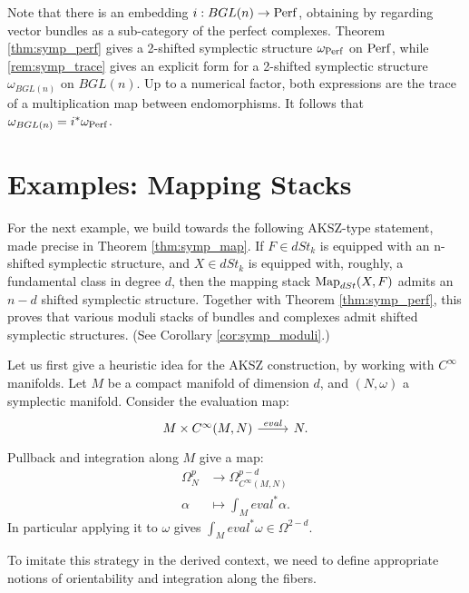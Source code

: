 \begin{rem}
Note that there is an embedding $i: BGL(n) \to \mathrm{Perf}$, obtaining by regarding vector bundles as a sub-category of the perfect
complexes. Theorem \ref{thm:symp_perf} gives a 2-shifted symplectic structure $\omega_{\mathrm{Perf}}$ on $\mathrm{Perf}$, while 
\ref{rem:symp_trace} gives
an explicit form for a 2-shifted symplectic structure $\omega_{BGL(n)}$ on $BGL(n)$. Up to a numerical factor, both 
expressions are the trace
of a multiplication map between endomorphisms. It follows that $\omega_{BGL(n)} = i^* \omega_{\mathrm{Perf}}$.
\end{rem}



\section{Examples: Mapping Stacks}
For the next example, we build towards the following AKSZ-type statement, made precise in Theorem \ref{thm:symp_map}.
If $F \in dSt_k$ is equipped with an n-shifted symplectic structure, and $X \in dSt_k$ 
is equipped with, roughly, a fundamental class in degree $d$, then the mapping stack $\operatorname{Map}_{dSt}(X,F)$ admits an
$n-d$ shifted symplectic structure. Together with Theorem \ref{thm:symp_perf}, this proves that various moduli stacks of
bundles and complexes admit shifted symplectic structures. (See Corollary \ref{cor:symp_moduli}.)

\begin{rem}
Let us first give a heuristic idea for the AKSZ construction, by working with $C^{\infty}$ manifolds. Let $M$ be a compact
manifold of dimension $d$, and $(N,\omega)$ a symplectic manifold. Consider the evaluation map:
\[
\begin{tikzcd}
	M \times C^{\infty}(M,N) \arrow{r}{eval} & N .
\end{tikzcd}
\]
Pullback and integration along $M$ give a map:
\begin{align*}
\Omega_N^p &\to \Omega^{p-d}_{C^{\infty}(M,N)} \\
\alpha &\mapsto \int_M eval^* \alpha.
\end{align*}
In particular applying it to $\omega$ gives $\int_M eval^*\omega \in \Omega^{2-d}$. 
\end{rem}

To imitate this strategy in the derived context, we need to define appropriate notions of orientability and integration
along the fibers.

